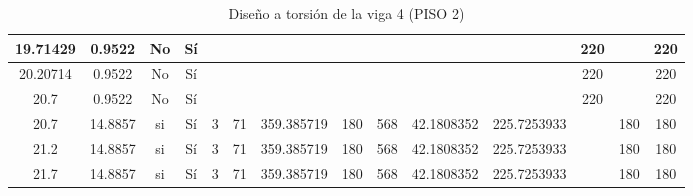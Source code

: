 \begin{table}[H]
{\begin{tabular}{|c|c|c|c|c|c|c|c|c|c|c|c|c|c|}
\hline
19.71429 & 0.9522 & No  & Sí  &     &     &     &     &     &     &     & 220 &     & 220 \bigstrut\\
\hline
20.20714 & 0.9522 & No  & Sí  &     &     &     &     &     &     &     & 220 &     & 220 \bigstrut\\
\hline
20.7 & 0.9522 & No  & Sí  &     &     &     &     &     &     &     & 220 &     & 220 \bigstrut\\
\hline
20.7 & 14.8857 & si  & Sí  & 3   & 71  & 359.385719 & 180 & 568 & 42.1808352 & 225.7253933 &     & 180 & 180 \bigstrut\\
\hline
21.2 & 14.8857 & si  & Sí  & 3   & 71  & 359.385719 & 180 & 568 & 42.1808352 & 225.7253933 &     & 180 & 180 \bigstrut\\
\hline
21.7 & 14.8857 & si  & Sí  & 3   & 71  & 359.385719 & 180 & 568 & 42.1808352 & 225.7253933 &     & 180 & 180 \bigstrut\\
\hline
\end{tabular}%


%
  }
      \caption{Diseño a torsión de la viga 4 (PISO 2) }
  \label{tab:T VG4 P2 }%
\end{table}%

